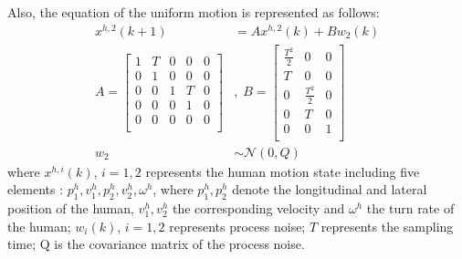 \documentclass[letterpaper, 10 pt, conference]{ieeeconf}
\begin{document}
	Also, the equation of the uniform motion is represented as follows:
	\small\begin{subequations}
		\begin{align*}
			x^{h,2}(k+1)&= Ax^{h,2}(k)+Bw_2(k) \label{eqn:h_d_dyn}\\
			A=\left[
			\begin{array}{ccccc}
				1& T& 0& 0& 0\\
				0& 1& 0& 0& 0\\
				0& 0& 1& T& 0\\
				0& 0& 0& 1& 0\\
				0& 0& 0& 0& 0\\
			\end{array}\right]&,\;
			B=\left[
			\begin{array}{ccc}
				\frac{T^2}{2}& 0& 0\\
				T& 0& 0\\
				0& \frac{T^2}{2}& 0\\
				0& T& 0\\
				0& 0& 1\\
			\end{array}\right] \\
			w_2&\sim\mathcal{N}(0,Q)
		\end{align*}
	\end{subequations}\normalsize
	where $x^{h,i}(k)$, $i=1,2$ represents the human motion state including five elements : $p^h_1,v^h_1,p^h_2,v^h_2,\omega^h$, where $p^h_1,p^h_2$ denote the longitudinal and lateral position of the human, $v^h_1,v^h_2$ the corresponding velocity and $\omega^h$ the turn rate of the human; $w_i(k)$, $i=1,2$ represents process noise; $T$ represents the sampling time; Q is the covariance matrix of the process noise.
	
\end{document}
